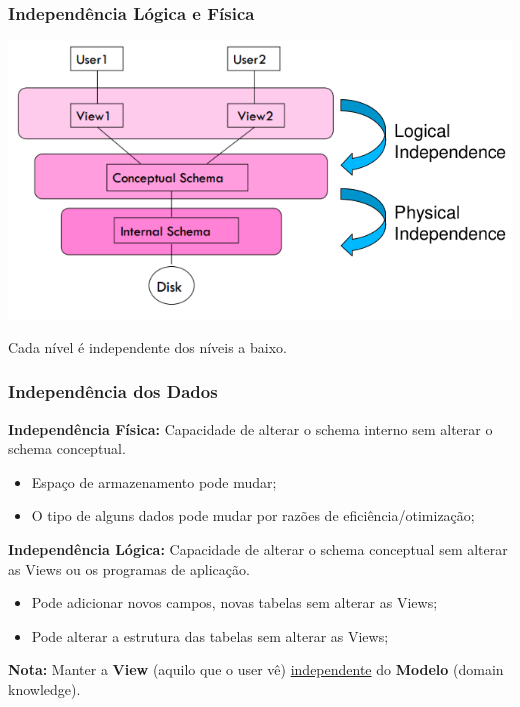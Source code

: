 \documentclass{article}
\begin{document}
\subsubsection{Independência Lógica e Física}

\begin{center}
    \includegraphics[scale=0.4]{2}
\end{center}

\begin{flushleft}
  Cada nível é independente dos níveis a baixo.
\end{flushleft}

\pagebreak

\subsubsection{Independência dos Dados}

\begin{flushleft}
  \textbf{Independência Física:} Capacidade de alterar o schema interno sem alterar
  o schema conceptual.
  \begin{itemize}
    \item Espaço de armazenamento pode mudar;
    \item O tipo de alguns dados pode mudar por razões de eficiência/otimização;
  \end{itemize}

  \textbf{Independência Lógica:} Capacidade de alterar o schema conceptual sem alterar
  as Views ou os programas de aplicação.
  \begin{itemize}
    \item Pode adicionar novos campos, novas tabelas sem alterar as Views;
    \item Pode alterar a estrutura das tabelas sem alterar as Views;
  \end{itemize}

  \vspace{5mm}

  \textbf{Nota:} Manter a \textbf{View} (aquilo que o user vê) \uline{independente} do \textbf{Modelo} (domain knowledge).
\end{flushleft}
\end{document}
